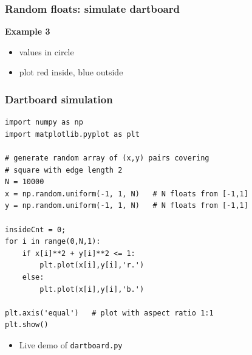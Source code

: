 \documentclass[english,14pt]{beamer}
\begin{document}

\begin{frame}[fragile]

\frametitle{Random floats: simulate dartboard}

\textbf{Example 3}\\
\vspace*{5mm}
\begin{itemize}
	\item values in circle
	\item plot red inside, blue outside
\end{itemize}

\end{frame}


\begin{frame}[fragile]

\frametitle{Dartboard simulation}
\begin{lstlisting}[style=CStyle,basicstyle=\scriptsize]
import numpy as np
import matplotlib.pyplot as plt

# generate random array of (x,y) pairs covering
# square with edge length 2
N = 10000
x = np.random.uniform(-1, 1, N)   # N floats from [-1,1]
y = np.random.uniform(-1, 1, N)   # N floats from [-1,1]

insideCnt = 0;
for i in range(0,N,1):
    if x[i]**2 + y[i]**2 <= 1:
        plt.plot(x[i],y[i],'r.')
    else:
        plt.plot(x[i],y[i],'b.')

plt.axis('equal')   # plot with aspect ratio 1:1
plt.show()
\end{lstlisting}
\vspace*{-3mm}
\begin{itemize}
	\item Live demo of \texttt{dartboard.py}
\end{itemize}
\end{frame}

\end{document}
